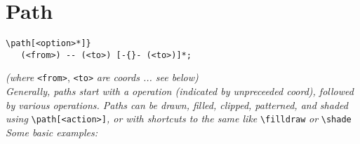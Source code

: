 \section{Path}


\begin{minipage}{6.5cm}\begin{lstlisting}
\path[<option>*]}
   (<from>) -- (<to>) [-{}- (<to>)]*;
\end{lstlisting}\end{minipage}
\textit{(where } \texttt{<from>}, \texttt{<to>} \textit{are coords ... see below)}\\

\textit{Generally, paths start with a  operation (indicated by unpreceeded coord), followed by various  operations. Paths can be drawn, filled, clipped, patterned, and shaded using }\texttt{\textbackslash path[<action>]}\textit{, or with shortcuts to the same like }\texttt{\textbackslash filldraw}\textit{ or }\texttt{\textbackslash shade}\textit{ Some basic examples:}\\

 \\
\\
 \\


